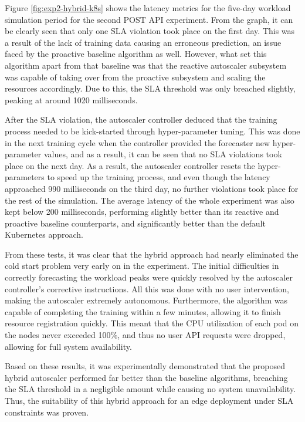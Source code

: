 Figure \ref{fig:exp2-hybrid-k8s} shows the latency metrics for the five-day workload simulation period for the second POST API experiment. From the graph, it can be clearly seen that only one SLA violation took place on the first day. This was a result of the lack of training data causing an erroneous prediction, an issue faced by the proactive baseline algorithm as well. However, what set this algorithm apart from that baseline was that the reactive autoscaler subsystem was capable of taking over from the proactive subsystem and scaling the resources accordingly. Due to this, the SLA threshold was only breached slightly, peaking at around 1020 milliseconds.\par
After the SLA violation, the autoscaler controller deduced that the training process needed to be kick-started through hyper-parameter tuning. This was done in the next training cycle when the controller provided the forecaster new hyper-parameter values, and as a result, it can be seen that no SLA violations took place on the next day. As a result, the autoscaler controller resets the hyper-parameters to speed up the training process, and even though the latency approached 990 milliseconds on the third day, no further violations took place for the rest of the simulation. The average latency of the whole experiment was also kept below 200 milliseconds, performing slightly better than its reactive and proactive baseline counterparts, and significantly better than the default Kubernetes approach.\par

From these tests, it was clear that the hybrid approach had nearly eliminated the cold start problem very early on in the experiment. The initial difficulties in correctly forecasting the workload peaks were quickly resolved by the autoscaler controller's corrective instructions. All this was done with no user intervention, making the autoscaler extremely autonomous. Furthermore, the algorithm was capable of completing the training within a few minutes, allowing it to finish resource registration quickly. This meant that the CPU utilization of each pod on the nodes never exceeded 100\%, and thus no user API requests were dropped, allowing for full system availability.\par

Based on these results, it was experimentally demonstrated that the proposed hybrid autoscaler performed far better than the baseline algorithms, breaching the SLA threshold in a negligible amount while causing no system unavailability. Thus, the suitability of this hybrid approach for an edge deployment under SLA constraints was proven.

